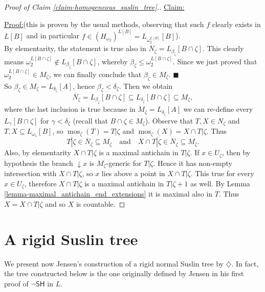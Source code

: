 \documentclass[11pt,a4paper]{report}
\theoremstyle{definition}
\theoremstyle{num.custom-title}
\theoremstyle{custom-title}
\newenvironment{claim}[1]{\par\noindent\underline{Claim#1:}\space}{} %
\newenvironment{claimproof}[1]{\par\noindent\underline{Proof:}\space#1}{\leavevmode\unskip\penalty9999 \hbox{}\nobreak\hfill\quad\hbox{$\blacksquare$}} %
\DeclareMathOperator{\sse}{\subseteq}
\DeclareMathOperator{\mos}{mos}
\newcommand{\nSH}{\ensuremath{\neg\mathsf{SH}}\xspace}
\newcommand{\ol}{\overline}
\begin{document}
\begin{proof}[Proof of Claim \ref{claim-homogeneous_suslin_tree}.]
\begin{claim}{}
\begin{claimproof}
(this is proven by the usual methods, observing that such $f$ clearly exists in $L[B]$ and in particular $f \in (H_{\omega_2})^{L[B]} = L_{\omega_2^{L[B]}}[B]$).\\
By elementarity, the statement is true also in $\ol{N}_\zeta = L_{\beta_\zeta}[B \cap \zeta]$. This clearly means 
$\omega_2^{L[B \cap \zeta]} \not\in L_{\beta_\zeta}[B \cap \zeta]$, whereby $\beta_\zeta \leq \omega_2^{L[B \cap \zeta]}$. Since we just proved that $\omega_2^{L[B \cap \zeta]} \in M_\zeta$, we can finally conclude that $\beta_\zeta \in M_\zeta$.
\end{claimproof}
\end{claim}
\\[10pt]
So $\beta_\zeta \in M_\zeta = L_{\delta_\zeta}[A]$, hence $\beta_\zeta < \delta_\zeta$. Then we obtain
\[
\ol{N}_\zeta = L_{\beta_\zeta}[B \cap \zeta] \sse L_{\delta_\zeta}[B \cap \zeta] \sse M_\zeta,
\]
where the last inclusion is true because in $M_\zeta = L_{\delta_\zeta}[A]$ we can re-define every $L_\gamma[B \cap \zeta]$ for $\gamma < \delta_\zeta$ (recall that $B \cap \zeta \in M_\zeta$). Observe that $T,X \in N_\zeta$ and $T,X \sse L_{\omega_1}[B]$, so $\mos_\zeta(T) = T|\zeta$ and $\mos_\zeta(X) = X \cap T|\zeta$. Thus
\[
T|\zeta \in \ol{N}_\zeta \sse M_\zeta \quad \text{and} \quad X \cap T|\zeta \in \ol{N}_\zeta \sse M_\zeta.
\]
Also, by elementarity $X \cap T|\zeta$ is a maximal antichain in $T|\zeta$. If $x \in U_\zeta$, then by hypothesis the branch ${\downarrow} x$ is $M_\zeta$-generic for $T|\zeta$. Hence it has non-empty intersection with $X \cap T|\zeta$, so $x$ lies above a point in $X \cap T|\zeta$. This true for every $x \in U_\zeta$, therefore $X \cap T|\zeta$ is a maximal antichain in $T|\zeta+1$ as well. By Lemma \ref{lemma-maximal_antichain_end_extensions} it is maximal also in $T$. Thus $X = X \cap T|\zeta$ and so $X$ is countable.
\end{proof}


\section{A rigid Suslin tree}

We present now Jensen's construction of a rigid normal Suslin tree by $\diamondsuit$. In fact, the tree constructed below is the one originally defined by Jensen in his first proof of \nSH in $L$.
\end{document}
